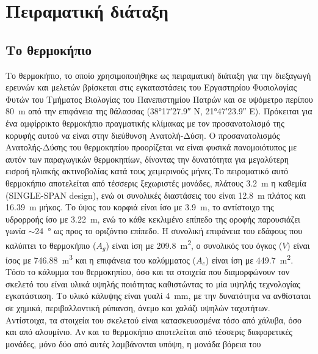 \documentclass[12pt, a4paper]{report} %
\newcommand{\english}{\foreignlanguage{english}}
\begin{document}
\newpage
\vspace*{6.5cm}
\sloppy
\section{Πειραματική διάταξη}\label{sec_peiramatiki_diataksi}
\fussy

\subsection{Το θερμοκήπιο}\label{sub_thermokipio}
Το θερμοκήπιο, το οποίο χρησιμοποιήθηκε ως πειραματική διάταξη για την διεξαγωγή ερ\-ευνών και μελετών βρίσκεται 
στις εγκαταστάσεις του Εργαστηρίου Φυσιολογίας Φυτών του Τμήματος Βιολογίας του Πανεπιστημίου Πατρών και σε υψόμετρο 
περίπου \SI{80}{\meter} από την επιφάνεια της θάλασσας (\ang{38;17;27.9} N, \ang{21;47;23.9} E). Πρόκειται για ένα 
αμφίρρικτο θερμοκήπιο πραγματικής κλίμακας με τον προσανατολισμό της κορυφής αυτού να είναι στην διεύθυνση Ανατολή-Δύση. 
Ο προσανατολισμός Ανατολής-Δύσης του θερμοκηπίου προορίζεται να είναι φυσικά πανομοιότυπος με αυτόν των παραγωγικών 
θερμοκηπίων, δίνοντας την δυνατότητα για μεγαλύτερη εισροή ηλιακής ακτινοβολίας κατά τους χειμερινούς μήνες.Το 
πειραματικό αυτό θερμοκήπιο αποτελείται από τέσσερις ξεχωριστές μονάδες, πλάτους \SI{3,2}{\meter} η καθεμία 
(\english{SINGLE-SPAN design}), ενώ οι συνολικές διαστάσεις του είναι \SI{12,8}{\meter} πλάτος και \SI{16,39}{\meter} 
μήκος. Το ύψος του κορφιά είναι ίσο με \SI{3,9}{\meter}, το αντίστοιχο της υδρορροής ίσο με \SI{3,22}{\meter}, ενώ το 
κάθε κεκλιμένο επίπεδο της οροφής παρουσιάζει γωνία $\sim$\SI{24}{\degree} ως προς το οριζόντιο επίπεδο. Η συνολική 
επιφάνεια του εδάφους που καλύπτει το θερμοκήπιο (\english{$A_g$}) είναι ίση με \SI{209,8}{\meter\squared}, ο συνολικός 
του όγκος (\english{$V$}) είναι ίσος με \SI{746,88}{\meter\cubed} και η επιφάνεια του καλύμματος (\english{$A_c$}) είναι 
ίση με \SI{449,7}{\meter\squared}. Τόσο το κάλυμμα του θερμοκηπίου, όσο και τα στοιχεία που διαμορφώνουν τον σκελετό του 
είναι υλικά υψηλής ποιότητας καθιστώντας το μία υψηλής τεχνολογίας εγκατάσταση. Το υλικό κάλυψης είναι γυαλί 
\SI{4}{\milli\meter}, με την δυνατότητα να ανθίσταται σε χημικά, περιβαλλοντική ρύπανση, άνεμο και χαλάζι υψηλών 
ταχυτήτων. Αντίστοιχα, τα στοιχεία του σκελετού είναι κατασκευασμένα τόσο από χάλυβα, όσο και από αλουμίνιο. Αν και το 
θερμοκήπιο αποτελείται από τέσσερις διαφορετικές μονάδες, μόνο δύο από αυτές λαμβάνονται υπόψη, η μονάδα βόρεια του 
\end{document}
